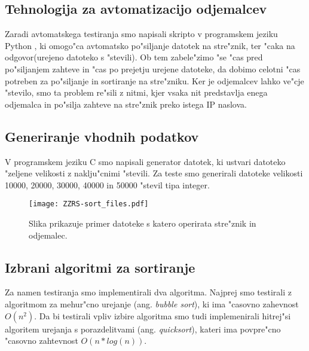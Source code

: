 \subsection{Tehnologija za avtomatizacijo odjemalcev}
Zaradi avtomatskega testiranja smo napisali skripto v programskem jeziku Python \cite{8_py}, ki omogo"ca avtomatsko po"siljanje datotek na stre"znik, ter "caka na odgovor(urejeno datoteko s "stevili). Ob tem zabele"zimo "se "cas pred po"siljanjem zahteve in "cas po prejetju urejene datoteke, da dobimo celotni "cas potreben za po"siljanje in sortiranje na stre"zniku. Ker je odjemalcev lahko ve"cje "stevilo, smo ta problem re"sili z nitmi, kjer vsaka nit predstavlja enega odjemalca in po"silja zahteve na stre"znik preko istega IP naslova.

\subsection{Generiranje vhodnih podatkov}
V programskem jeziku C smo napisali generator datotek, ki ustvari datoteko "zeljene velikosti z naklju"cnimi "stevili. Za teste smo generirali datoteke velikosti 10000, 20000, 30000, 40000 in 50000 "stevil tipa integer.

\begin{figure} [!h]
  \centering
    \texttt{[image: ZZRS-sort\_files.pdf]}
  \caption{Slika prikazuje primer datoteke s katero operirata stre"znik in odjemalec.}
  \label{8_files}
\end{figure}

\subsection{Izbrani algoritmi za sortiranje}
\label{8_izbira_algoritmov}
Za namen testiranja smo implementirali dva algoritma. Najprej smo testirali z algoritmom za mehur"cno urejanje (ang. \textit{bubble sort}), ki ima "casovno zahevnost $O(n^2)$.
Da bi testirali vpliv izbire algoritma smo tudi implemenirali hitrej"si algoritem urejanja s porazdelitvami (ang. \textit{quicksort}), kateri ima povpre"cno "casovno zahtevnost $O(n* log(n))$.



